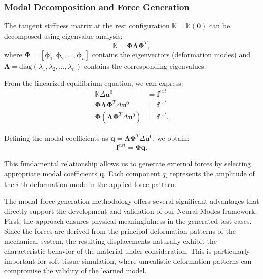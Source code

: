 \subsubsection{Modal Decomposition and Force Generation}

The tangent stiffness matrix at the rest configuration $\mathbb{K} = \mathbb{K}(\bm{0})$ can be decomposed using eigenvalue analysis:
\begin{equation}
    \mathbb{K} = \boldsymbol{\Phi} \boldsymbol{\Lambda} \boldsymbol{\Phi}^T,
\end{equation}
where $\boldsymbol{\Phi} = [\bm{\phi}_1, \bm{\phi}_2, \ldots, \bm{\phi}_n]$ contains the eigenvectors (deformation modes) and $\boldsymbol{\Lambda} = \text{diag}(\lambda_1, \lambda_2, \ldots, \lambda_n)$ contains the corresponding eigenvalues.

From the linearized equilibrium equation, we can express:
\begin{align}
    \mathbb{K} \Delta\bm{u}^0 &= \bm{f}^{ext} \\
    \boldsymbol{\Phi} \boldsymbol{\Lambda} \boldsymbol{\Phi}^T \Delta\bm{u}^0 &= \bm{f}^{ext} \\
    \boldsymbol{\Phi} (\boldsymbol{\Lambda} \boldsymbol{\Phi}^T \Delta\bm{u}^0) &= \bm{f}^{ext}.
\end{align}

Defining the modal coefficients as $\bm{q} = \boldsymbol{\Lambda} \boldsymbol{\Phi}^T \Delta\bm{u}^0$, we obtain:
\begin{equation}
    \bm{f}^{ext} = \boldsymbol{\Phi} \bm{q}.
\end{equation}

This fundamental relationship allows us to generate external forces by selecting appropriate modal coefficients $\bm{q}$. Each component $q_i$ represents the amplitude of the $i$-th deformation mode in the applied force pattern.


The modal force generation methodology offers several significant advantages that directly support the development and validation of our Neural Modes framework. First, the approach ensures physical meaningfulness in the generated test cases. Since the forces are derived from the principal deformation patterns of the mechanical system, the resulting displacements naturally exhibit the characteristic behavior of the material under consideration. This is particularly important for soft tissue simulation, where unrealistic deformation patterns can compromise the validity of the learned model.

